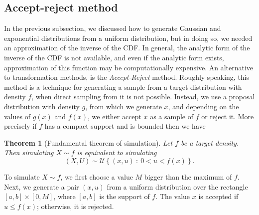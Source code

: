 \documentclass{article}\usepackage[]{graphicx}\usepackage[]{xcolor}
\newtheorem{theorem}{Theorem}
\begin{document}
\subsection{Accept-reject method}
In the previous subsection, we discussed how to generate Gaussian and exponential distributions from a uniform distribution, but in doing so, we needed an approximation of the inverse of the CDF. In general, the analytic form of the inverse of the CDF is not available, and even if the analytic form exists, approximation of this function may be computationally expensive. An alternative to transformation methods, is the \textit{Accept-Reject} method.
Roughly speaking, this method is a technique for generating a sample from a target distribution with density $f$, when direct sampling from it is not possible. Instead, we use a proposal distribution with density $g$, from which we generate $x$, and depending on the values of $g(x)$ and $f(x)$, we either accept $x$ as a sample of $f$ or reject it. More precisely if $f$ has a compact support and is bounded then we have 


\begin{theorem}[Fundamental theorem of simulation]\label{Fundamental theorem of simulation}
Let $f$ be a target density. Then simulating $X\sim f$ is equivalent to simulating 
\begin{equation}\label{Fund thm of sim eq}
\left(X, U\right) \sim \mathcal{U}\left\{(x,u)~:~0< u < f(x)\right\}.
\end{equation}

\end{theorem}

To simulate $X \sim f$, we first choose a value $M$ bigger than the maximum of $f$. Next, we generate a pair $(x, u)$ from a uniform distribution over the rectangle $[a, b] \times [0, M]$, where $[a,b]$ is the support of $f$. The value $x$ is accepted if $u \leq f(x)$; otherwise, it is rejected.
\end{document}
